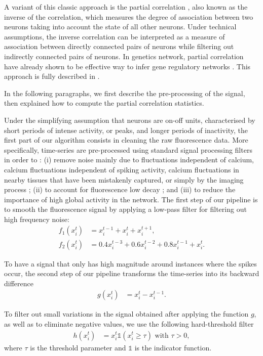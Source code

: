 \documentclass[wcp]{jmlr}
\begin{document}
A variant of this classic approach is the partial correlation
\citep{sutera2014simple}, also known as the inverse of the correlation, which
measures the degree of association between two neurons taking into account the
state of all other neurons. Under technical assumptions, the inverse
correlation can be interpreted as a measure of association between directly
connected pairs of neurons while filtering out indirectly connected pairs of
neurons. In genetics network, partial correlation have already shown to be
effective way to infer gene regulatory networks
\citep{de2004discovery,Schafer:2005}. This approach is fully described in
\cite{sutera2014simple}. 

In the following paragraphs, we first describe the pre-processing of the signal,
then explained how to compute the partial correlation statistics.

Under the simplifying assumption that neurons are on-off units, characterised
by short periods of intense activity, or peaks, and longer periods of
inactivity, the first part of our algorithm consists in cleaning the raw
fluorescence data. More specifically, time-series are pre-processed using
standard signal processing filters in order to : (i) remove noise mainly due
to fluctuations independent of calcium, calcium fluctuations independent of
spiking activity, calcium fluctuations in nearby tissues that have been
mistakenly captured, or simply by the imaging process ; (ii) to account for
fluorescence low decay ; and (iii) to reduce the importance of high global
activity in the network. The first step of our pipeline is to smooth the
fluorescence signal by applying a low-pass filter for filtering out high
frequency noise:  
\begin{align} f_1(x^t_i) &= x^{t-1}_i + x^t_i + x^{t+1}_i,
\label{eq:symetric-median} \\ f_2(x^t_i) &= 0.4 x^{t-3}_i + 0.6 x^{t-2}_i +
0.8 x^{t-1}_i + x_i^t. \label{eq:weighted- asymetric-median} 
\end{align}

To have a signal that only has high magnitude around instances where the
spikes occur, the second step of our pipeline transforms the time-series into
its backward difference 
\begin{align} g(x^{t}_{i}) &= x^{t}_i - x^{t-1}_i.
\label{eq:high-pass-filter}
\end{align}

To filter out small variations in the signal obtained after applying the
function $g$, as well as to eliminate negative values, we use the following
hard-threshold filter
\begin{align}\label{eqn:hfilter}
h(x^{t}_i) &= x^{t}_i \mathbb{1}(x^{t}_i \geq \tau) \text{ with } \tau > 0,
\end{align}
where $\tau$ is the threshold parameter and $\mathbb{1}$ is the indicator
function.
\end{document}
